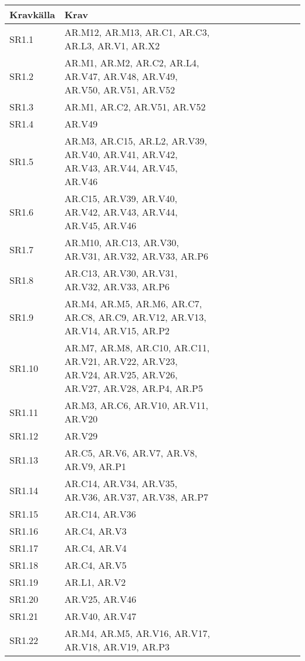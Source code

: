 \documentclass[a4paper, twoside, 11pt, titlepage]{article}
\begin{document}
	\begin {table} [ht] \begin{tabular} {  p{5cm} p{2cm} p{2cm} p{2cm} p{2cm} p{2cm} p{2cm} p{2cm} p{2cm} p{2cm} p{2cm} }
		\hline
		{Kravkälla} & {Krav} \\
		\hline
		{SR1.1} & {AR.M12, AR.M13, AR.C1, AR.C3, AR.L3, AR.V1, AR.X2} \\
		\hline
		{SR1.2} & {AR.M1, AR.M2, AR.C2, AR.L4, AR.V47, AR.V48, AR.V49, AR.V50, AR.V51, AR.V52} \\
		\hline
		{SR1.3} & {AR.M1, AR.C2, AR.V51, AR.V52} \\
		\hline
		{SR1.4} & {AR.V49} \\
		\hline
		{SR1.5} & {AR.M3, AR.C15, AR.L2, AR.V39, AR.V40, AR.V41, AR.V42, AR.V43, AR.V44, AR.V45, AR.V46} \\
		\hline
		{SR1.6} & {AR.C15, AR.V39, AR.V40, AR.V42, AR.V43, AR.V44, AR.V45, AR.V46} \\
		\hline
		{SR1.7} & {AR.M10, AR.C13, AR.V30, AR.V31, AR.V32, AR.V33, AR.P6} \\
		\hline
		{SR1.8} & {AR.C13, AR.V30, AR.V31, AR.V32, AR.V33, AR.P6} \\
		\hline
		{SR1.9} & {AR.M4, AR.M5, AR.M6, AR.C7, AR.C8, AR.C9, AR.V12, AR.V13, AR.V14, AR.V15, AR.P2} \\
		\hline
		{SR1.10} & {AR.M7, AR.M8, AR.C10, AR.C11, AR.V21, AR.V22, AR.V23, AR.V24, AR.V25, AR.V26, AR.V27, AR.V28, AR.P4, AR.P5} \\
		\hline
		{SR1.11} & {AR.M3, AR.C6, AR.V10, AR.V11, AR.V20} \\
		\hline
		{SR1.12} & {AR.V29} \\
		\hline
		{SR1.13} & {AR.C5, AR.V6, AR.V7, AR.V8, AR.V9, AR.P1} \\
		\hline
		{SR1.14} & {AR.C14, AR.V34, AR.V35, AR.V36, AR.V37, AR.V38, AR.P7} \\
		\hline
		{SR1.15} & {AR.C14, AR.V36} \\
		\hline
		{SR1.16} & {AR.C4, AR.V3} \\
		\hline
		{SR1.17} & {AR.C4, AR.V4} \\
		\hline
		{SR1.18} & {AR.C4, AR.V5} \\
		\hline
		{SR1.19} & {AR.L1, AR.V2} \\
		\hline
		{SR1.20} & {AR.V25, AR.V46} \\
		\hline
		{SR1.21} & {AR.V40, AR.V47} \\
		\hline
		{SR1.22} & {AR.M4, AR.M5, AR.V16, AR.V17, AR.V18, AR.V19, AR.P3} \\

\end{tabular}
\end{table}
\end{document}
